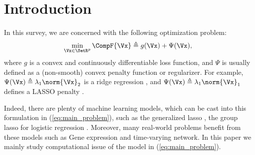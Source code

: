 \documentclass[
10pt, %
a4paper, %
oneside, %
headinclude,footinclude, %
BCOR5mm, %
]{scrartcl}
\begin{document}

{\let\thefootnote\relax{}}



\newpage 


\section{Introduction}
\paragraph{}
In this survey, we are concerned with the following optimization problem: 
\begin{equation} \label{eq:main_problem}
	\min_{\Vx \in \SetR^p} \CompF{\Vx} \triangleq g(\Vx) + \Psi(\Vx),
\end{equation}
where $ g $ is a convex and continuously differentiable loss function, and 
$\Psi $ is usually defined as a (non-smooth) convex penalty function or 
regularizer. For example, $\Psi(\Vx) \triangleq \lambda_1 \norm{\Vx}_2 $ 
is a ridge regression , and  $\Psi(\Vx) \triangleq \lambda_1 \norm{\Vx}_1 $ 
defines a LASSO penalty \cite{tibshirani1996regression}.

Indeed, there are plenty of machine learning models, which  can be cast into 
this formulation in (\ref{eq:main_problem}), such as the generalized lasso 
\cite{tibshirani2011solution}, the group lasso for logistic regression 
\cite{meier2008group}. Moreover, many real-world problems benefit from 
these models such as Gene expression and time-varying network. In this paper we 
mainly study computational issue  of the model in (\ref{eq:main_problem}).
\end{document}
